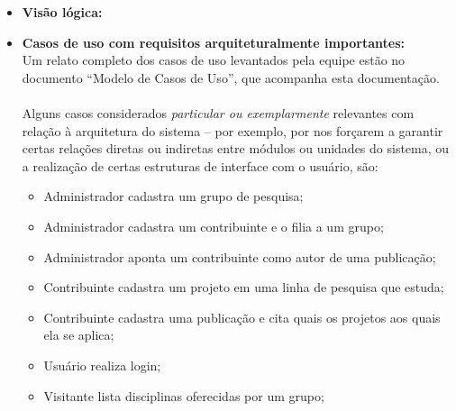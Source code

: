 \documentclass[11pt, a4paper]{article}
\begin{document}
        \begin{itemize}
            \item \textbf{Visão lógica:}
                \\

            
            \item \textbf{Casos de uso com requisitos arquiteturalmente
            importantes:}
                \\
                Um relato completo dos casos de uso levantados pela equipe
                estão no documento ``Modelo de Casos de Uso'', que acompanha
                esta documentação.
                \\\\
                Alguns casos considerados \textit{particular ou exemplarmente}
                relevantes com relação à arquitetura do sistema -- por exemplo,
                por nos forçarem a garantir certas relações diretas ou
                indiretas entre módulos ou unidades do sistema, ou a realização
                de certas estruturas de interface com o usuário, são:
                \begin{itemize}
                    \item Administrador cadastra um grupo de pesquisa;
                    
                    \item Administrador cadastra um contribuinte e o filia a
                    um grupo;
                    
                    \item Administrador aponta um contribuinte como autor de
                    uma publicação;
                    
                    \item Contribuinte cadastra um projeto em uma linha de
                    pesquisa que estuda;
                    
                    \item Contribuinte cadastra uma publicação e cita quais
                    os projetos aos quais ela se aplica;

                    \item Usuário realiza login;
                    
                    \item Visitante lista disciplinas oferecidas por um grupo;
                    

\end{itemize}
\end{itemize}
\end{document}
